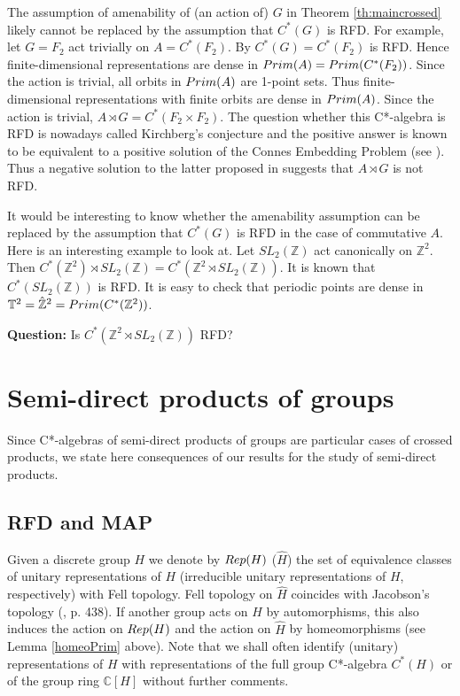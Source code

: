 \documentclass[11 pt, leqno, hidelinks]{amsart}%
\theoremstyle{plain}
\numberwithin{equation}{section}
\newcommand{\C}{\mathbb{C}}
\newcommand{\Rep}{\textup{Rep}}
\newcommand{\Prim}{\textup{Prim}}
\begin{document}
	
	The assumption of amenability of (an action of) $G$ in Theorem  \ref{th:maincrossed} likely cannot be replaced by the assumption that $C^*(G)$ is RFD.  For example, let $G = F_2$ act trivially on $A = C^*(F_2)$. By \cite{Choi} $C^*(G) = C^*(F_2)$ is RFD. Hence finite-dimensional representations are dense in $\Prim(A) = \Prim(C^*(F_2))$. Since the action is trivial, all orbits in $\Prim(A)$ are 1-point sets. Thus finite-dimensional representations with finite orbits are dense in $\Prim(A)$. Since the action is trivial, $A\rtimes G = C^*(F_2\times F_2)$. The question whether this C*-algebra  is RFD is nowadays called Kirchberg's conjecture and the positive answer is known to be equivalent to a positive solution of the Connes Embedding Problem (see \cite{Taka}). Thus a negative solution to the latter proposed in \cite{CEP} suggests that $A\rtimes G $ is not RFD.

\medskip

	It would be interesting to know whether the amenability assumption can be replaced by the assumption that $C^*(G)$ is RFD in the case of commutative $A$.  Here is an interesting example to look at. Let $SL_2(\mathbb Z)$ act canonically on $\mathbb Z^2$.  Then $ C^*(\mathbb Z^2) \rtimes SL_2(\mathbb Z) =  C^*(\mathbb Z^2\rtimes SL_2(\mathbb Z))$.  It is known that $C^*(SL_2(\mathbb Z))$ is RFD. It is easy to check that periodic points are dense in $\mathbb T^2 = \hat{\mathbb Z}^2 = \Prim(C^*(\mathbb Z^2))$.
	
	\medskip
	
	{\bf Question:} Is $C^*(\mathbb Z^2\rtimes SL_2(\mathbb Z))$ RFD?
	
	\medskip
	

\medskip



\section{Semi-direct products of groups} \label{sec:Semidirect}

Since C*-algebras of semi-direct products of groups are particular cases of crossed products, we state here consequences of our results for the study of semi-direct products.



\subsection{RFD and MAP}

Given a discrete group $H$ we denote by $\Rep(H)$ ($\widehat H$) the set of equivalence classes of unitary representations of $H$ (irreducible unitary representations of $H$, respectively) with Fell topology.  Fell topology on $\widehat H$ coincides with Jacobson's topology (\cite{BookPropT}, p. 438).  If another group acts on $H$ by automorphisms, this also induces the action on  $\Rep(H)$ and  the action on $\widehat H$ by homeomorphisms (see Lemma \ref{homeoPrim} above). Note that we shall often identify (unitary) representations of $H$ with representations of the full group C*-algebra $C^*(H)$ or of the group ring $\C[H]$ without further comments.
\end{document}
